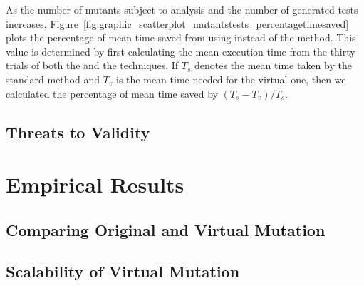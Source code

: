 
As the number of mutants subject to analysis and the number of generated tests increases, Figure~\ref{fig:graphic_scatterplot_mutantstests_percentagetimesaved} plots the percentage of mean time saved from using \vma instead of the \Original method.  This value is determined by first calculating the mean execution time from the thirty trials of both the \Standard and the \virtual techniques. If $T_s$ denotes the mean time taken by the standard method and $T_v$ is the mean time needed for the virtual one, then we calculated the percentage of mean time saved by $({T_s - T_v})/{T_s}$.

\subsection{Threats to Validity}
\label{sec:threats-to-validity}


\section{Empirical Results}
\label{sec:empirical-results}


\subsection{Comparing Original and Virtual Mutation}
\label{sec:empirical-study-RQ-original-virtual-time}



\subsection{Scalability of Virtual Mutation}
\label{sec:empirical-study-RQ-scalability-mutants-tests}


